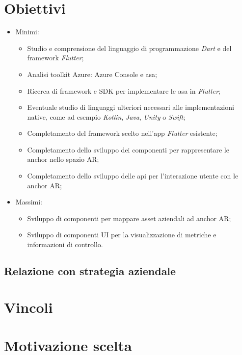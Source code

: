 \section{Obiettivi}
\begin{itemize}
    \item Minimi:
        \begin{itemize}
            \item Studio e comprensione del linguaggio di programmazione \textit    {Dart} e del {framework} \textit{Flutter};
            \item Analisi toolkit Azure: Azure Console e {asa};
            \item Ricerca di {framework} e {SDK} per implementare le    {asa} in \textit{Flutter};
            \item Eventuale studio di linguaggi ulteriori necessari alle    implementazioni native, come ad esempio \textit{Kotlin}, \textit{Java},    \textit{Unity} o \textit{Swift};
            \item Completamento del {framework} scelto nell'app \textit{Flutter}    esistente;
            \item Completamento dello sviluppo dei componenti per rappresentare le {anchor} nello spazio AR;
            \item Completamento dello sviluppo delle \acrshort{api} per l'interazione utente con le {anchor} AR;
        \end{itemize}
    \item Massimi: 
        \begin{itemize}
            \item Sviluppo di componenti per mappare {asset} aziendali ad {anchor} AR;
            \item Sviluppo di componenti UI per la visualizzazione di metriche e informazioni di controllo.
        \end{itemize}
\end{itemize}

\subsection{Relazione con strategia aziendale}
\section{Vincoli}
\section{Motivazione scelta}
